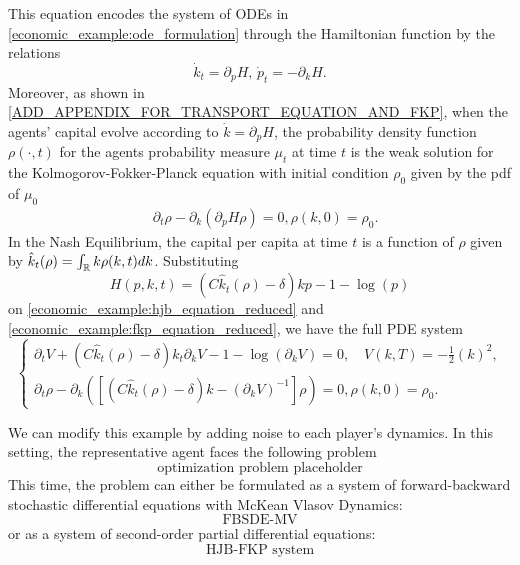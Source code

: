 \documentclass{article}
\begin{document}
This equation encodes the system of ODEs in \ref{economic_example:ode_formulation} through the Hamiltonian function by the relations
\begin{equation*}
    \dot k_t = \partial_p H,\, \dot p_t = -\partial_k H.
\end{equation*}
Moreover, as shown in \ref{ADD_APPENDIX_FOR_TRANSPORT_EQUATION_AND_FKP},
when the agents' capital evolve according to $\dot k = \partial_p H$,
the probability density function $\rho(\cdot, t)$ for the agents probability measure $\mu_t$ at time $t$
is the weak solution for the Kolmogorov-Fokker-Planck equation with initial condition $\rho_0$ given by the pdf of $\mu_0$
\begin{equation}\label{economic_example:fkp_equation_reduced}
\begin{split}
    &\partial_t \rho - \partial_k \left( \partial_p H \rho \right) = 0, \rho(k,0) = \rho_0.
\end{split}
\end{equation}
In the Nash Equilibrium, the capital per capita at time $t$ is a function of $\rho$ given by $\hat k_t(\rho) = \int_{\mathbb{R}} k \rho(k,t) dk$.
Substituting 
\begin{equation*}
    H(p,k,t) = \left(C {\hat k_t(\rho) - \delta}\right)k p  - 1  - \log(p)
\end{equation*}
on \ref{economic_example:hjb_equation_reduced} and \ref{economic_example:fkp_equation_reduced}, we have the full PDE system
\begin{equation}
    \begin{cases}
        \partial_t V +  \left(C {\hat k_t(\rho) - \delta}\right)k_t \partial_k V - 1  - \log(\partial_k V) = 0,\quad V(k,T) = -\frac{1}{2}(k)^2,\\
        \partial_t \rho - \partial_k \left( \left[ \left(C {\hat k_t}(\rho) - \delta\right) k - (\partial_k V)^{-1} \right]\rho \right) = 0, \rho(k,0) = \rho_0.
    \end{cases}
\end{equation}
\color{black}

We can modify this example by adding noise to each player's dynamics.
In this setting, the representative agent faces the following problem
\begin{equation}
    \text{optimization problem placeholder}
\end{equation}
This time, the problem can either be formulated as a system of 
forward-backward stochastic differential equations with McKean Vlasov Dynamics:
\begin{equation}
    \text{FBSDE-MV}
\end{equation}
or as a system of second-order partial differential equations:
\begin{equation}
    \text{HJB-FKP system}
\end{equation}
\end{document}
